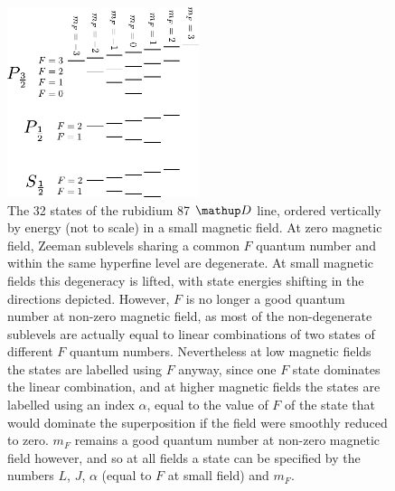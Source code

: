 \begin{figure}%
\begin{center}
\includegraphics[width=0.5\textwidth]{figures/atomic_physics/D_line.pdf}
\caption{The 32 states of the rubidium 87 $\up{D}$ line, ordered vertically by energy (not to scale) in a small magnetic field. At zero magnetic field, Zeeman sublevels sharing a common $F$ quantum number and within the same hyperfine level are degenerate. At small magnetic fields this degeneracy is lifted, with state energies shifting in the directions depicted. However, $F$ is no longer a good quantum number at non-zero magnetic field, as most of the non-degenerate sublevels are actually equal to linear combinations of two states of different $F$ quantum numbers. Nevertheless at low magnetic fields the states are labelled using $F$ anyway, since one $F$ state dominates the linear combination, and at higher magnetic fields the states are labelled using an index $\alpha$, equal to the value of $F$ of the state that would dominate the superposition if the field were smoothly reduced to zero. $m_F$ remains a good quantum number at non-zero magnetic field however, and so at all fields a state can be specified by the numbers $L$, $J$, $\alpha$ (equal to $F$ at small field) and $m_F$.} \label{fig:D_line}
\end{center}
\end{figure}


